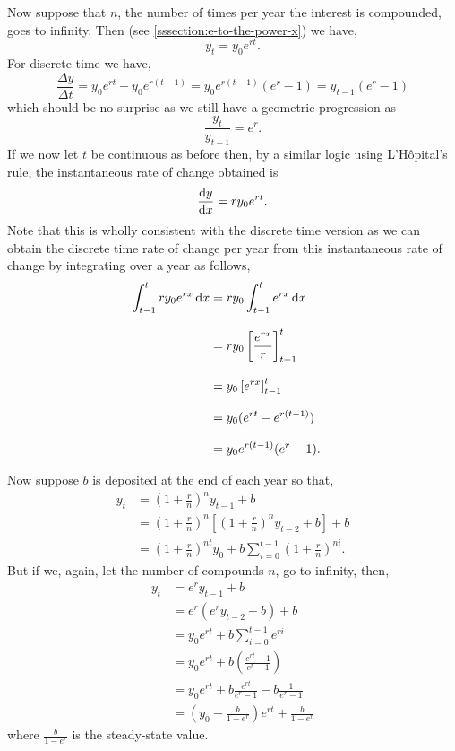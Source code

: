 \documentclass[../MathsNotesBase.tex]{subfiles}
\begin{document}
{\begin{exe}
{				Now suppose that $n$, the number of times per year the interest is compounded, goes to infinity. Then (see \ref{sssection:e-to-the-power-x}) we have,
				\[ y_t = y_0 e^{rt}. \]
				For discrete time we have,
				\[ \frac{\Delta y}{\Delta t} = y_0 e^{rt} - y_0 e^{r(t-1)} = y_0 e^{r(t-1)} (e^r - 1) = y_{t-1} (e^r - 1) \]
				which should be no surprise as we still have a geometric progression as
				\[ \frac{y_t}{y_{t-1}} = e^r. \]
				If we now let $t$ be continuous as before then, by a similar logic using L'H\^{o}pital's rule, the instantaneous rate of change obtained is
				\[ \frac{\dif y}{\dif x} = r y_0 e^{rt}. \]
				Note that this is wholly consistent with the discrete time version as we can obtain the discrete time rate of change per year from this instantaneous rate of change by integrating over a year as follows,
				\begin{align*}
				\int_{t-1}^t r y_0 e^{rx} \dif x &= r y_0 \int_{t-1}^t e^{rx} \dif x \\[8pt]
				&= r y_0 \left[\frac{e^{rx}}{r}\right]_{t-1}^t &\sidecomment{} \\[8pt]
				&= y_0 \left[e^{rx}\right]_{t-1}^t &\sidecomment{} \\[8pt]
				&= y_0 (e^{rt} - e^{r(t-1)}) &\sidecomment{} \\[8pt]
				&= y_0  e^{r(t-1)} (e^r - 1). &\sidecomment{}
				\end{align*}
				
				\bigskip
				Now suppose $b$ is deposited at the end of each year so that,
				\begin{align*}
					y_t &= \left(1 + \frac{r}{n}\right)^n y_{t-1} + b \\
					&=  \left(1 + \frac{r}{n}\right)^n \left[ \left(1 + \frac{r}{n}\right)^n y_{t-2} + b \right] + b \\
					&=  \left(1 + \frac{r}{n}\right)^{nt} y_0 + b \sum_{i=0}^{t-1} \left(1 + \frac{r}{n}\right)^{ni}.
				\end{align*}
				But if we, again, let the number of compounds $n$, go to infinity, then,
				\begin{align*}
					y_t &= e^{r} y_{t-1} + b \\
					&=  e^{r} ( e^{r} y_{t-2} + b ) + b \\[6pt]
					&=  y_0 e^{rt} + b \sum_{i=0}^{t-1} e^{ri} \\[6pt]
					&=  y_0 e^{rt} + b \left( \frac{e^{rt} - 1}{e^r - 1} \right) \\[6pt]
					&=  y_0 e^{rt} + b \frac{e^{rt}}{e^r - 1} - b \frac{1}{e^r - 1} \\[6pt]
					&=  \left( y_0 - \frac{b}{1 - e^r} \right) e^{rt} + \frac{b}{1 - e^r}
				\end{align*}	
				where ${ \frac{b}{1 - e^r} }$ is the steady-state value.
			}
		

\end{exe}}
\end{document}
